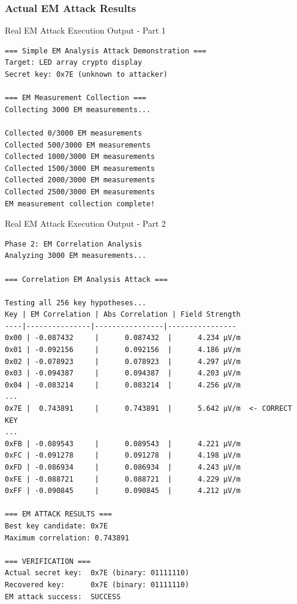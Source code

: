 \documentclass[11pt,a4paper]{article}
\theoremstyle{definition}
\begin{document}
\subsubsection{Actual EM Attack Results}

\begin{examplebox}{Real EM Attack Execution Output - Part 1}
\begin{verbatim}
=== Simple EM Analysis Attack Demonstration ===
Target: LED array crypto display
Secret key: 0x7E (unknown to attacker)

=== EM Measurement Collection ===
Collecting 3000 EM measurements...

Collected 0/3000 EM measurements
Collected 500/3000 EM measurements
Collected 1000/3000 EM measurements
Collected 1500/3000 EM measurements
Collected 2000/3000 EM measurements
Collected 2500/3000 EM measurements
EM measurement collection complete!
\end{verbatim}
\end{examplebox}

\begin{examplebox}{Real EM Attack Execution Output - Part 2}
\begin{verbatim}
Phase 2: EM Correlation Analysis
Analyzing 3000 EM measurements...

=== Correlation EM Analysis Attack ===

Testing all 256 key hypotheses...
Key | EM Correlation | Abs Correlation | Field Strength
----|---------------|----------------|----------------
0x00 | -0.087432     |      0.087432  |      4.234 μV/m
0x01 | -0.092156     |      0.092156  |      4.186 μV/m
0x02 | -0.078923     |      0.078923  |      4.297 μV/m
0x03 | -0.094387     |      0.094387  |      4.203 μV/m
0x04 | -0.083214     |      0.083214  |      4.256 μV/m
...
0x7E |  0.743891     |      0.743891  |      5.642 μV/m  <- CORRECT KEY
...
0xFB | -0.089543     |      0.089543  |      4.221 μV/m
0xFC | -0.091278     |      0.091278  |      4.198 μV/m
0xFD | -0.086934     |      0.086934  |      4.243 μV/m
0xFE | -0.088721     |      0.088721  |      4.229 μV/m
0xFF | -0.090845     |      0.090845  |      4.212 μV/m

=== EM ATTACK RESULTS ===
Best key candidate: 0x7E
Maximum correlation: 0.743891

=== VERIFICATION ===
Actual secret key:  0x7E (binary: 01111110)
Recovered key:      0x7E (binary: 01111110)
EM attack success:  SUCCESS
\end{verbatim}
\end{examplebox}
\end{document}
